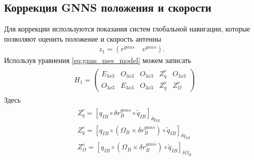 \documentclass[a4paper,12pt]{article}
\begin{document}
\subsection{Коррекция GNNS положения и скорости}
Для коррекции используются показания систем глобальной навигации, которые позволяют оценить положение и скорость антенны
\begin{align}
z_1 = (r^{gnns} \quad v^{gnns}).
\end{align}
Используя уравнения \eqref{eq:gnns_mes_model} можем записать 
\begin{align}
\begin{split}
&H_1 =
\begin{pmatrix}
E_{3x3} & O_{3x3} & O_{3x3} & Z^r_q & O_{3x3}   \\
O_{3x3} & E_{3x3} & O_{3x3} & Z^v_q & Z^v_{\Omega}
\end{pmatrix}
\end{split}
\end{align}
Здесь
\begin{align}
\begin{split}
&Z^r_q = [q_{IB} \circ \delta r^{gnns}_B \circ \tilde{q}_{IB}]_{\delta q_{IB}} \\
&Z^v_q = [q_{IB} \circ  (\Omega_B \times \delta r^{gnns}_B) \circ \tilde{q}_{IB}]_{\delta q_{IB}} \\
&Z^v_\Omega = [q_{IB} \circ  (\Omega_B \times \delta r^{gnns}_B) \circ \tilde{q}_{IB}]_{\delta \Omega_B}
\end{split}
\end{align}
\end{document}
